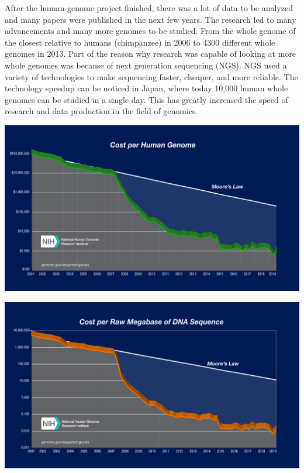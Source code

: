 \documentclass[acmsmall]{acmart}
\newenvironment{Figure}
  {\par\medskip\noindent\minipage{\linewidth}}
  {\endminipage\par\medskip}
\begin{document}
\begin{multicols}{2}
After the human genome project finished, there was a lot of data to be analyzed and many papers were published in the next few years. The research led to many advancements and many more genomes to be studied. From the whole genome of the closest relative to humans (chimpanzee) in 2006 to 4300 different whole genomes in 2013\cite[~p.442]{campbell}. Part of the reason why research was capable of looking at more whole genomes was because of next generation sequencing (NGS). NGS used a variety of technologies to make sequencing faster, cheaper, and more reliable\cite[~p.67]{paulselzer2018}. The technology speedup can be noticed in Japan, where today 10,000 human whole genomes can be studied in a single day. This has greatly increased the speed of research and data production in the field of genomics.

\begin{Figure}
\centering
\includegraphics[width=0.80\linewidth]{images/human-gen-cost.jpg} 
\label{fig:human_gen_cost_fig}
\end{Figure}

\begin{Figure}
\centering
\includegraphics[width=0.80\linewidth]{images/seq-cost.jpeg} 
\label{fig:megabase_cost_fig}
\end{Figure}



\end{multicols}
\end{document}
